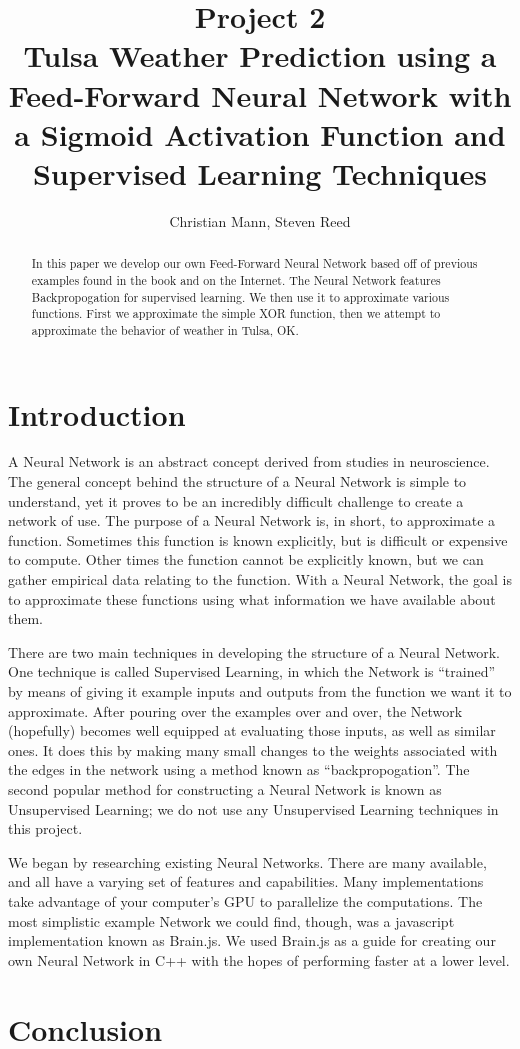 \documentclass{article}
\title{Project 2\\Tulsa Weather Prediction using a Feed-Forward Neural Network with a Sigmoid Activation Function and Supervised Learning Techniques}
\author{Christian Mann, Steven Reed}
\begin{document}
\maketitle

\begin{multicols}{2}

\begin{abstract}
In this paper we develop our own Feed-Forward Neural Network based off of previous examples found in the book and on the Internet. The Neural Network features Backpropogation for supervised learning. We then use it to approximate various functions. First we approximate the simple XOR function, then we attempt to approximate the behavior of weather in Tulsa, OK.
\end{abstract}

\section{Introduction}

A Neural Network is an abstract concept derived from studies in neuroscience. The general concept behind the structure of a Neural Network is simple to understand, yet it proves to be an incredibly difficult challenge to create a network of use. The purpose of a Neural Network is, in short, to approximate a function. Sometimes this function is known explicitly, but is difficult or expensive to compute. Other times the function cannot be explicitly known, but we can gather empirical data relating to the function. With a Neural Network, the goal is to approximate these functions using what information we have available about them.

There are two main techniques in developing the structure of a Neural Network. One technique is called Supervised Learning, in which the Network is ``trained'' by means of giving it example inputs and outputs from the function we want it to approximate. After pouring over the examples over and over, the Network (hopefully) becomes well equipped at evaluating those inputs, as well as similar ones. It does this by making many small changes to the weights associated with the edges in the network using a method known as ``backpropogation''. The second popular method for constructing a Neural Network is known as Unsupervised Learning; we do not use any Unsupervised Learning techniques in this project.

We began by researching existing Neural Networks. There are many available, and all have a varying set of features and capabilities. Many implementations take advantage of your computer's GPU to parallelize the computations. The most simplistic example Network we could find, though, was a javascript implementation known as Brain.js. We used Brain.js as a guide for creating our own Neural Network in C++ with the hopes of performing faster at a lower level.


\section{Conclusion}

\end{multicols}
\end{document}
